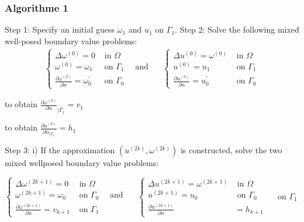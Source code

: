 \subsubsection*{Algorithme 1}
Step 1: Specify an initial guess $\omega_{1}$ and $u_{1}$ on $\Gamma_{1}$.
Step 2: Solve the following mixed well-posed boundary value problems:
\begin{align*}
	\left\{\begin{array}{ll}
		       \Delta \omega^{(0)}=0 & \text { in } \Omega \\
		       \omega^{(0)}=\omega_{1} & \text { on } \Gamma_{1} \quad \text { and } \\
		       \frac{\partial \omega^{(0)}}{\partial n}=\omega_{0}^{\prime} & \text { on } \Gamma_{0}
	\end{array} \quad\left\{\begin{array}{ll}
		                        \Delta u^{(0)}=\omega^{(0)} & \text { in } \Omega \\
		                        u^{(0)}=u_{1} & \text { on } \Gamma_{1} \\
		                        \frac{\partial u^{(0)}}{\partial n}=u_{0}^{\prime} & \text { on } \Gamma_{0}
	\end{array}\right.\right.
\end{align*}


to obtain $\frac{\partial \omega^{(0)}}{\partial n}_{| \Gamma_{1}}=v_{1}$


to obtain $\frac{\partial u^{(0)}}{\partial n_{| \Gamma_{1}}}=h_{1}$


Step 3:
i) If the approximation $\left(u^{(2 k)}, \omega^{(2 k)}\right)$ is constructed, solve the two mixed wellposed boundary value problems:


$\left\{\begin{array}{ll}\Delta \omega^{(2 k+1)}=0 & \text { in } \Omega \\ \omega^{(2 k+1)}=\omega_{0} & \text { on } \Gamma_{0} \quad \text { and } \\ \frac{\partial \omega^{(2 k+1)}}{\partial n}=v_{k+1} & \text { on } \Gamma_{1}\end{array} \quad\left\{\begin{array}{ll}\Delta u^{(2 k+1)}=\omega^{(2 k+1)} & \text { in } \Omega \\ u^{(2 k+1)}=u_{0} & \text { on } \Gamma_{0} \\ \frac{\partial u^{(2 k+1)}}{\partial n} & =h_{k+1}\end{array} \quad \text { on } \Gamma_{1}\right.\right.$


